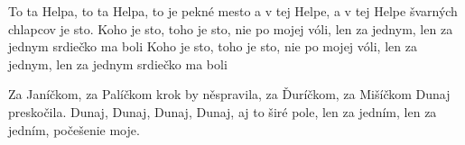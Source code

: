 
\beginverse{}
To ta Helpa, to ta Helpa, to je pekné mesto
a v tej Helpe, a v tej Helpe švarných chlapcov je sto.
Koho je sto, toho je sto, nie po mojej vóli,
len za jednym, len za jednym srdiečko ma boli
Koho je sto, toho je sto, nie po mojej vóli,
len za jednym, len za jednym srdiečko ma boli
\endverse{}

\beginverse{}
Za Janíčkom, za Palíčkom krok by něspravila,
za Ďuríčkom, za Mišíčkom Dunaj preskočila.
\lrep{} Dunaj, Dunaj, Dunaj, Dunaj, aj to širé pole,
len za jedním, len za jedním, počešenie moje. \rrep{}
\endverse{}

\endsong{}
